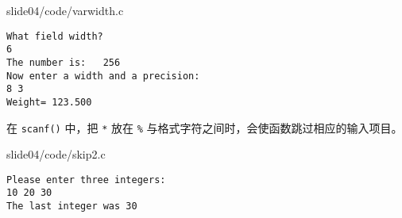 \begin{frame}
  
  {slide04/code/varwidth.c}
\end{frame}

\begin{frame}[fragile]
\begin{lstlisting}[showspaces=true,backgroundcolor=\color{red!20}]
What field width?
6
The number is:   256
Now enter a width and a precision:
8 3
Weight= 123.500
\end{lstlisting}
\end{frame}

\begin{frame}[fragile]
 在 \lstinline|scanf()| 中，把 \lstinline|*| 放在 \lstinline|%| 与格式字符之间时，会使函数跳过相应的输入项目。
\end{frame}

\begin{frame}[fragile]

  
  {slide04/code/skip2.c}

  \pause 
\begin{lstlisting}[showspaces=true,backgroundcolor=\color{red!10}]
Please enter three integers:
10 20 30
The last integer was 30
\end{lstlisting}
\end{frame}





